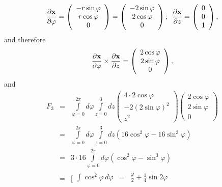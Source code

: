 {\begin{enumerate}
$$
  \frac{\partial {\bf x}}{\partial \varphi} =
  \left(
    \begin{array}{c}
      -r \sin \varphi \\
       r \cos \varphi \\
       0
    \end{array}
  \right)=
  \left(
    \begin{array}{c}
      -2 \sin \varphi \\
       2 \cos \varphi \\
       0
    \end{array}
  \right); \enspace
  \frac{\partial {\bf x}}{\partial z} =
  \left(
    \begin{array}{c}
      0 \\
      0 \\
      1
    \end{array}
  \right) ,
$$
and therefore
$$
    \frac{\partial {\bf x}}{\partial \varphi} \times
    \frac{\partial {\bf x}}{\partial z}
 =
  \left(
    \begin{array}{c}
      2 \cos \varphi \\
      2 \sin \varphi \\
      0
    \end{array}
  \right),
$$
and
\begin{eqnarray*}
  F_3 & = & \int \limits_{\varphi =0}^{2 \pi} \!\! d\varphi
    \int \limits_{z=0}^3 \!\! dz
    \left(
      \begin{array}{c}
        4 \cdot 2 \cos \varphi \\
        -2(2 \sin \varphi)^2 \\
        z^2
      \end{array}
    \right)
    \left(
      \begin{array}{c}
        2 \cos \varphi \\
        2 \sin \varphi \\
        0
      \end{array}
    \right)  \\
    &= & \int \limits_{\varphi =0}^{2 \pi} \!\! d\varphi
    \int \limits_{z=0}^3 \!\! dz
    \left(16 \cos^2 \varphi -16 \sin^3 \varphi\right)  \\
  & = & 3 \cdot 16 \int \limits_{\varphi =0}^{2 \pi} \!\! d\varphi
    \left( \cos^2\varphi - \sin^3 \varphi \right)  \\
  & = &
    \Biggl[
      \begin{array}{rcl}
        \int \cos^2 \varphi \, d\varphi & = & \frac{\varphi}{2}+
          \frac{1}{4} \sin 2 \varphi \\

\end{array}
\end{eqnarray*}
\end{enumerate}}
